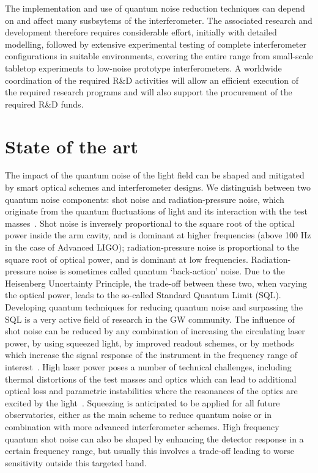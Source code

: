 The implementation and use of quantum noise reduction techniques can depend on and affect many susbsytems of the interferometer. The associated research and development therefore requires considerable effort, initially with detailed modelling, followed by extensive experimental testing of complete interferometer configurations in suitable environments, covering the entire range from small-scale tabletop experiments to low-noise prototype interferometers. A worldwide coordination of the required R\&D activities will allow an efficient execution of the required research programs and will also support the procurement of the required R\&D funds. 
 
\section{State of the art}
The impact of the quantum noise of the light field can be shaped and mitigated by smart optical schemes and interferometer designs. We distinguish between two quantum noise components: shot noise and radiation-pressure noise, which originate from the quantum fluctuations of light and its interaction with the test masses~\cite{Cav1980}. Shot noise is inversely proportional to the square root of the optical power inside the arm cavity, and is dominant at higher frequencies (above 100 Hz in the case of Advanced LIGO); radiation-pressure noise is proportional to the square root of optical power, and is dominant at low frequencies. Radiation-pressure noise is sometimes called quantum `back-action' noise. Due to the Heisenberg Uncertainty Principle, the trade-off between these two, when varying the optical power, leads to the so-called Standard Quantum Limit (SQL). Developing quantum techniques for reducing quantum noise and surpassing the SQL is a very active field of research in the GW community. 
\pagebreak
The influence of shot noise can be reduced by any combination of increasing the circulating laser power, by using squeezed light, by improved readout schemes, or by methods which increase the signal response of the instrument in the frequency range of interest~\cite{StMe1991,Mizuno:RSE1993,Osamu:2006}. High laser power poses a number of technical challenges, including thermal distortions of the test masses and optics which can lead to additional optical loss and parametric instabilities where the resonances of the optics are excited by the light~\cite{BSV2001,Evans:2015raa}. Squeezing is anticipated to be applied for all future observatories, either as the main scheme to reduce quantum noise or in combination with more advanced interferometer schemes. High frequency quantum shot noise can also be shaped by enhancing the detector response in a certain frequency range, but usually this involves a trade-off leading to worse sensitivity outside this targeted band.  

